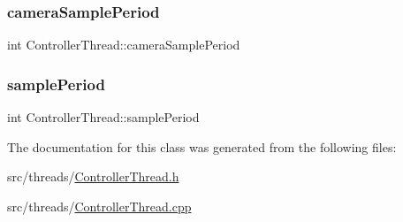 \subsubsection{\texorpdfstring{camera\+Sample\+Period}{cameraSamplePeriod}}
{\footnotesize\ttfamily int Controller\+Thread\+::camera\+Sample\+Period\hspace{0.3cm}{\ttfamily [private]}}

\mbox{\label{classControllerThread_a5dcd0069c7d31295c7e1e598c31fadf7}} 
\subsubsection{\texorpdfstring{sample\+Period}{samplePeriod}}
{\footnotesize\ttfamily int Controller\+Thread\+::sample\+Period\hspace{0.3cm}{\ttfamily [private]}}



The documentation for this class was generated from the following files\+:\begin{DoxyCompactItemize}
\item 
src/threads/\hyperlink{ControllerThread_8h}{Controller\+Thread.\+h}\item 
src/threads/\hyperlink{ControllerThread_8cpp}{Controller\+Thread.\+cpp}\end{DoxyCompactItemize}
